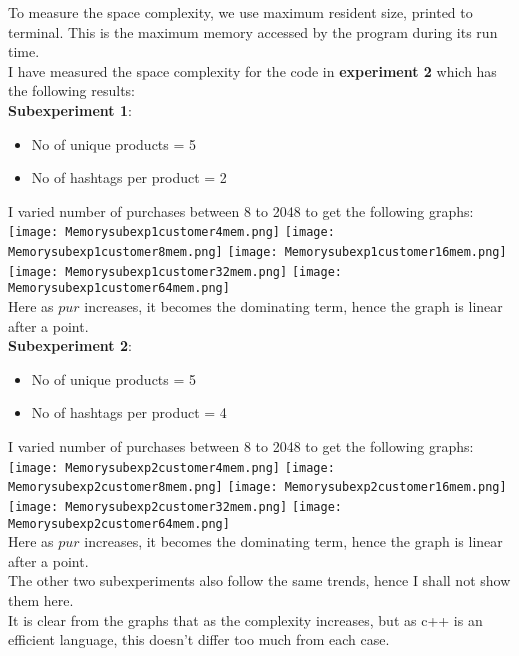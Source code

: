 \documentclass[12pt]{article}
\begin{document}
To measure the space complexity, we use maximum resident size, printed to terminal. This is the maximum memory accessed by the program during its run time.\\
I have measured the space complexity for the code in \textbf{experiment 2} which has the following results:\\
\textbf{Subexperiment 1}:\\
\begin{itemize}
    \item No of unique products = 5
    \item No of hashtags per product = 2
\end{itemize}
I varied number of purchases between 8 to 2048 to get the following graphs:
\texttt{[image: Memorysubexp1customer4mem.png]}
\texttt{[image: Memorysubexp1customer8mem.png]}
\texttt{[image: Memorysubexp1customer16mem.png]}
\texttt{[image: Memorysubexp1customer32mem.png]}
\texttt{[image: Memorysubexp1customer64mem.png]}\\
Here as $pur$ increases, it becomes the dominating term, hence the graph is linear after a point.\\

\textbf{Subexperiment 2}:\\
\begin{itemize}
    \item No of unique products = 5
    \item No of hashtags per product = 4
\end{itemize}
I varied number of purchases between 8 to 2048 to get the following graphs:
\texttt{[image: Memorysubexp2customer4mem.png]}
\texttt{[image: Memorysubexp2customer8mem.png]}
\texttt{[image: Memorysubexp2customer16mem.png]}
\texttt{[image: Memorysubexp2customer32mem.png]}
\texttt{[image: Memorysubexp2customer64mem.png]}\\
Here as $pur$ increases, it becomes the dominating term, hence the graph is linear after a point.\\

The other two subexperiments also follow the same trends, hence I shall not show them here.\\

It is clear from the graphs that as the complexity increases, but as c++ is an efficient language, this doesn't differ too much from each case.\\
\end{document}
